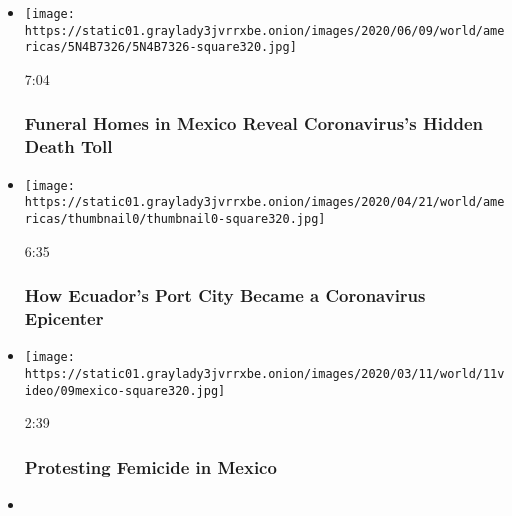 \begin{itemize}
\item
  \href{https://www.nytimes3xbfgragh.onion/video/world/americas/100000007144621/coronavirus-mexico-death-toll.html?action=click\&module=video-series-bar\&region=header\&pgtype=Article\&playlistId=video/on-the-ground}{}

  \texttt{[image: https://static01.graylady3jvrrxbe.onion/images/2020/06/09/world/americas/5N4B7326/5N4B7326-square320.jpg]}

  7:04

  \hypertarget{funeral-homes-in-mexico-reveal-coronaviruss-hidden-death-toll}{%
  \subsubsection{Funeral Homes in Mexico Reveal Coronavirus's Hidden
  Death
  Toll}\label{funeral-homes-in-mexico-reveal-coronaviruss-hidden-death-toll}}
\item
  \href{https://www.nytimes3xbfgragh.onion/video/world/americas/100000007082011/coronavirus-deaths-ecuador-covid-19.html?action=click\&module=video-series-bar\&region=header\&pgtype=Article\&playlistId=video/on-the-ground}{}

  \texttt{[image: https://static01.graylady3jvrrxbe.onion/images/2020/04/21/world/americas/thumbnail0/thumbnail0-square320.jpg]}

  6:35

  \hypertarget{how-ecuadors-port-city-became-a-coronavirus-epicenter}{%
  \subsubsection{How Ecuador's Port City Became a Coronavirus
  Epicenter}\label{how-ecuadors-port-city-became-a-coronavirus-epicenter}}
\item
  \href{https://www.nytimes3xbfgragh.onion/video/world/americas/100000007023396/march-femicide-women-mexico.html?action=click\&module=video-series-bar\&region=header\&pgtype=Article\&playlistId=video/on-the-ground}{}

  \texttt{[image: https://static01.graylady3jvrrxbe.onion/images/2020/03/11/world/11video/09mexico-square320.jpg]}

  2:39

  \hypertarget{protesting-femicide-in-mexico}{%
  \subsubsection{Protesting Femicide in
  Mexico}\label{protesting-femicide-in-mexico}}
\item
  \href{https://www.nytimes3xbfgragh.onion/video/world/americas/100000006930887/migrant-caravan-mexico.html?action=click\&module=video-series-bar\&region=header\&pgtype=Article\&playlistId=video/on-the-ground}{}


\end{itemize}
